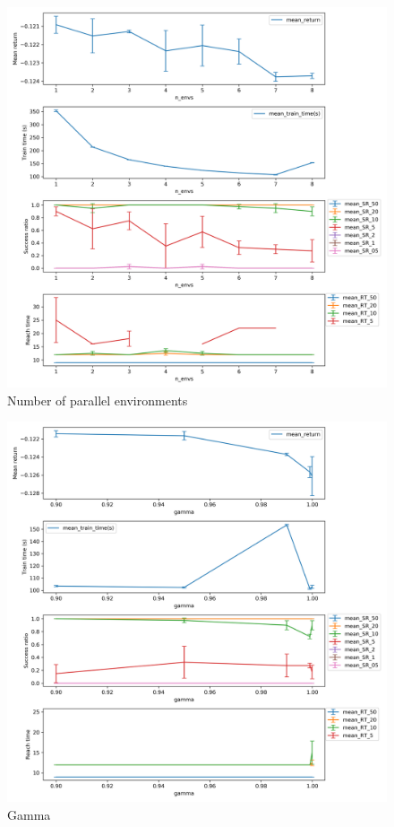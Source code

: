 \documentclass{article}
\begin{document}
\begin{figure}[H]
    \centering
    \includegraphics[width=\textwidth]{../ppo2_n_envs.png}
\caption{Number of parallel environments}
\end{figure}

\begin{figure}[H]
    \centering
    \includegraphics[width=\textwidth]{../ppo2_gamma.png}
\caption{Gamma}
\end{figure}
\end{document}
